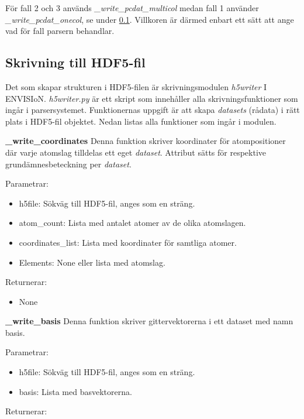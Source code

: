 \documentclass[10pt,oneside,swedish]{article}
\providecommand{\tightlist}{%
  \setlength{\itemsep}{0pt}\setlength{\parskip}{0pt}}
\begin{document}
För fall 2 och 3 används \emph{\_write\_pcdat\_multicol} medan fall 1
använder \emph{\_write\_pcdat\_onecol}, se under \ref{skrivning-till-hdf5-fil}. Villkoren är därmed enbart ett sätt att ange
vad för fall parsern behandlar.

\subsection{Skrivning till HDF5-fil}\label{skrivning-till-hdf5-fil}

Det som skapar strukturen i HDF5-filen är skrivningsmodulen
\emph{h5writer} I ENVISIoN. \emph{h5writer.py} är ett skript som
innehåller alla skrivningsfunktioner som ingår i parsersystemet.
Funktionernas uppgift är att skapa \emph{datasets} (rådata) i rätt plats
i HDF5-fil objektet. Nedan listas alla funktioner som ingår i modulen.

\textbf{\_write\_coordinates} Denna funktion skriver koordinater för
atompositioner där varje atomslag tilldelas ett eget \emph{dataset}.
Attribut sätts för respektive grundämnesbeteckning per \emph{dataset}.

Parametrar:

\begin{itemize}
\tightlist
\item
  h5file: Sökväg till HDF5-fil, anges som en sträng.
\item
  atom\_count: Lista med antalet atomer av de olika atomslagen.
\item
  coordinates\_list: Lista med koordinater för samtliga atomer.
\item
  Elements: None eller lista med atomslag.
\end{itemize}

Returnerar:

\begin{itemize}
\tightlist
\item
  None
\end{itemize}

\textbf{\_write\_basis} Denna funktion skriver gittervektorerna i ett
dataset med namn basis.

Parametrar:

\begin{itemize}
\tightlist
\item
  h5file: Sökväg till HDF5-fil, anges som en sträng.
\item
  basis: Lista med basvektorerna.
\end{itemize}

Returnerar:
\end{document}
